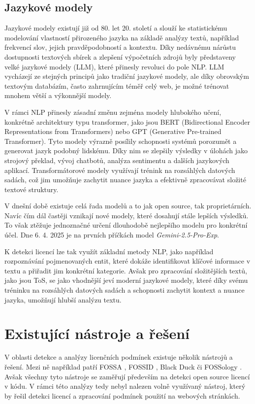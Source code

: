\subsection{Jazykové modely}
Jazykové modely existují již od 80. let 20. století a slouží ke statistickému modelování vlastností přirozeného jazyka na základě analýzy textů, například frekvencí slov, jejich pravděpodobností a kontextu.
Díky nedávnému nárůstu dostupnosti textových sbírek a zlepšení výpočetních zdrojů byly představeny velké jazykové modely (LLM), které přinesly revoluci do pole NLP.
LLM vycházejí ze stejných principů jako tradiční jazykové modely, ale díky obrovským textovým databázím, často zahrnujícím téměř celý web, je možné trénovat mnohem větší a výkonnější modely. \cite{10.3389/frai.2023.1350306}

V rámci NLP přinesly zásadní změnu zejména modely hlubokého učení, konkrétně architektury typu transformer, jako jsou BERT (Bidirectional Encoder Representations from Transformers) nebo GPT (Generative Pre-trained Transformer).
Tyto modely výrazně posílily schopnosti systémů porozumět a generovat jazyk podobný lidskému.
Díky nim se zlepšily výsledky v úlohách jako strojový překlad, vývoj chatbotů, analýza sentimentu a dalších jazykových aplikací.
Transformátorové modely využívají trénink na rozsáhlých datových sadách, což jim umožňuje zachytit nuance jazyka a efektivně zpracovávat složité textové struktury. \cite{SureshBabu2023}

V dnešní době existuje celá řada modelů a to jak open source, tak proprietárních.
Navíc čím dál častěji vznikají nové modely, které dosahují stále lepších výsledků.
To však ztěžuje jednoznačné určení dlouhodobě nejlepšího modelu pro konkrétní účel.
Dne 6. 4. 2025 je na prvních příčkách model \textit{Gemini-2.5-Pro-Exp}. \cite{lmarenaAI, trackingaiTracking}

K detekci licencí lze tak využít základní metody NLP, jako například rozpoznávání pojmenovaných entit, které dokáže identifikovat klíčové informace v textu a přiřadit jim konkrétní kategorie.
Avšak pro zpracování složitějších textů, jako jsou ToS, se jako vhodnější jeví moderní jazykové modely, které díky svému tréninku na rozsáhlých datových sadách a schopnosti zachytit kontext a nuance jazyka, umožňují hlubší analýzu textu.

\section{Existující nástroje a řešení}
V oblasti detekce a analýzy licenčních podmínek existuje několik nástrojů a řešení.
Mezi ně například patří FOSSA \cite{fossaFOSSAControl}, FOSSID \cite{fossID}, Black Duck \cite{blackduckApplicationSecurity} či FOSSology \cite{fossologyFOSSology}.
Avšak všechny tyto nástroje se zaměřují především na detekci open source licencí v kódu.
V rámci této analýzy tedy nebyl nalezen volně využívaný nástroj, který by řešil detekci licencí a zpracování podmínek použití na webových stránkách.

